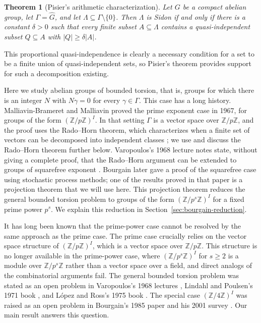 \documentclass[11pt]{amsart}
\newtheorem{theorem}{Theorem}[section]
\newcommand{\Z}{\mathbb{Z}}
\begin{document}
\begin{theorem}[Pisier's arithmetic characterization]\label{thm:pisier}
Let \(G\) be a compact abelian group, let \(\Gamma=\widehat G\), and let
\(\Lambda\subseteq \Gamma\setminus\{0\}\). Then \(\Lambda\) is Sidon if and only if there is a constant \(\delta>0\) such that every finite subset \(A\subseteq\Lambda\) contains a quasi-independent subset \(Q\subseteq A\) with \(|Q|\geq \delta |A|\).
\end{theorem}

This proportional quasi-independence is clearly a necessary condition for a set to be a finite union of quasi-independent sets, so Pisier's theorem provides support for such a decomposition existing.

Here we study abelian groups of bounded torsion, that is, groups for which there is an integer \(N\) with \(N\gamma=0\) for every \(\gamma\in\Gamma\). This case has a long history. Malliavin-Brameret and Malliavin \cite{MM} proved the prime exponent case in 1967, for groups of the form \((\Z/p\Z)^I\). In that setting \(\Gamma\) is a vector space over \(\Z/p\Z\), and the proof uses the Rado--Horn theorem, which characterizes when a finite set of vectors can be decomposed into independent classes \cite{R,H}; we use and discuss the Rado--Horn theorem further below. Varopoulos's 1968 lecture notes state, without giving a complete proof, that the Rado--Horn argument can be extended to groups of squarefree exponent \cite{V}. Bourgain later gave a proof \cite{B83} of the squarefree case using stochastic process methods; one of the results proved in that paper is a projection theorem that we will use here. This projection theorem reduces the general bounded torsion problem to groups of the form \((\Z/p^s\Z)^I\) for a fixed prime power \(p^s\). We explain this reduction in Section~\ref{sec:bourgain-reduction}.

It has long been known that the prime-power case cannot be resolved by the same approach as the prime case. The prime case crucially relies on the vector space structure of \((\Z/p\Z)^I\), which is a vector space over \(\Z/p\Z\). This structure is no longer available in the prime-power case, where \((\Z/p^s\Z)^I\) for \(s\geq 2\) is a module over \(\Z/p^s\Z\) rather than a vector space over a field, and direct analogs of the combinatorial arguments fail. The general bounded torsion problem was stated as an open problem in Varopoulos's 1968 lectures \cite{V}, Lindahl and Poulsen's 1971 book \cite{LP}, and L\'opez and Ross's 1975 book \cite{LR}. The special case \( (\Z/4\Z)^I\) was raised as an open problem in Bourgain's 1985 paper \cite{Bourgain1985ArithmeticDiameter} and his 2001 survey \cite{Bourgain2001LambdaP}. Our main result answers this question.
\end{document}
